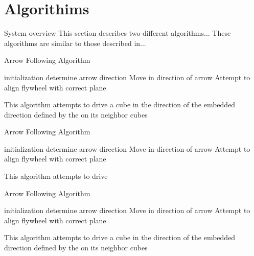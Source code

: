 \section{Algorithims}
\label{sec:Algorithims}




\label{sec:RWconfiguration}

System overview
This section describes two different algorithms... These algorithms are similar to those described in...


	
\begin{algorithm}[htbp] 
	\caption{Arrow Following Algorithm}
	\label{algorithmArrow}
	\SetAlgoLined
	initialization\;
	{
		determine arrow direction\;
		{
			Move in direction of arrow\;
		}
		{
			 Attempt to align flywheel with correct plane\;
		}
	}
	\caption{This algorithm attempts to drive a cube in the direction of the embedded direction defined by the \tagName on its neighbor cubes}

\end{algorithm}


\begin{algorithm}[htbp] 
	\caption{Arrow Following Algorithm}
	\label{algorithmLine}
	\SetAlgoLined
	initialization\;
	{
		determine arrow direction\;
		{
			Move in direction of arrow\;
		}
		{
			Attempt to align flywheel with correct plane\;
		}
	}
	\caption{This algorithm attempts to drive }
	
\end{algorithm}


\begin{algorithm}[htbp] 
	\caption{Arrow Following Algorithm}
	\label{algorithmAggregate}
	\SetAlgoLined
	initialization\;
	{
		determine arrow direction\;
		{
			Move in direction of arrow\;
		}
		{
			Attempt to align flywheel with correct plane\;
		}
	}
	\caption{This algorithm attempts to drive a cube in the direction of the embedded direction defined by the \tagName on its neighbor cubes}
	
\end{algorithm}
